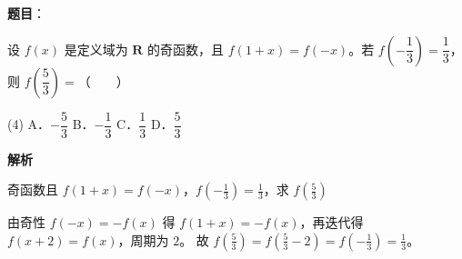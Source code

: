 \begin{answer}

\textbf{题目}：

设 $f(x)$ 是定义域为 $\mathbf R$ 的奇函数，且 $f(1+x)=f(-x)$。若 $f\left(-\dfrac13\right)=\dfrac13$，则 $f\left(\dfrac53\right)=$\mbox{（　　）}

\begin{gkopts}(4)
\task A．$-\dfrac53$
\task B．$-\dfrac13$
\task C．$\dfrac13$
\task D．$\dfrac53$
\end{gkopts}

\textbf{解析}

奇函数且 $f(1+x)=f(-x)$，$f\left(-\tfrac13\right)=\tfrac13$，求 $f\left(\tfrac53\right)$

由奇性 $f(-x)=-f(x)$ 得 $f(1+x)=-f(x)$，再迭代得 $f(x+2)=f(x)$，周期为 $2$。
故 $f\left(\tfrac53\right)=f\left(\tfrac53-2\right)=f\left(-\tfrac13\right)=\tfrac13$。


\par\medskip

\end{answer}

